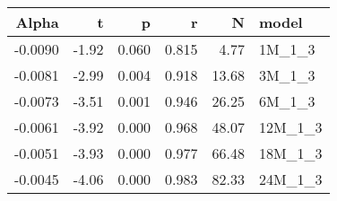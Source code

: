 \begin{table}[ht]
\centering
\begin{tabular}{rrrrrl}
  \hline
Alpha & t & p & r & N & model \\ 
  \hline
-0.0090 & -1.92 & 0.060 & 0.815 & 4.77 & 1M\_1\_3 \\ 
  -0.0081 & -2.99 & 0.004 & 0.918 & 13.68 & 3M\_1\_3 \\ 
  -0.0073 & -3.51 & 0.001 & 0.946 & 26.25 & 6M\_1\_3 \\ 
  -0.0061 & -3.92 & 0.000 & 0.968 & 48.07 & 12M\_1\_3 \\ 
  -0.0051 & -3.93 & 0.000 & 0.977 & 66.48 & 18M\_1\_3 \\ 
  -0.0045 & -4.06 & 0.000 & 0.983 & 82.33 & 24M\_1\_3 \\ 
   \hline
\end{tabular}
\end{table}

